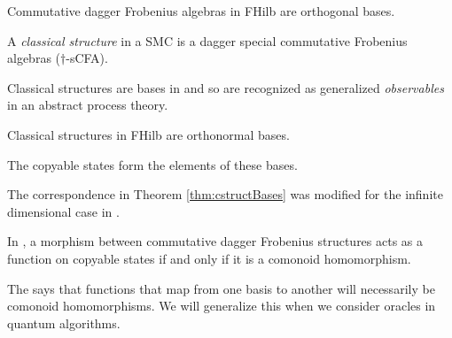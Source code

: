 \begin{theorem}{\cite[Thm 5.1]{coecke2013new}}
Commutative dagger Frobenius algebras in FHilb are orthogonal bases.
\end{theorem}

\begin{defn}
A \emph{classical structure} in a SMC is a dagger special commutative Frobenius algebras ($\dagger$-sCFA).
\end{defn}
\noindent Classical structures are bases in  and so are recognized as generalized \emph{observables} in an abstract process theory.

\begin{theorem}{\cite[Sec 6]{coecke2013new}}
\label{thm:cstructBases}
Classical structures in FHilb are orthonormal bases.
\end{theorem}

\noindent The copyable states form the elements of these bases.

\begin{remark}
The correspondence in Theorem \ref{thm:cstructBases} was modified for the infinite dimensional case in \cite{abramsky2012h}.
\end{remark}

\begin{theorem}
\end{theorem}

\begin{corollary}
In , a morphism between commutative dagger Frobenius structures acts as a function on copyable states if and only if it is a comonoid homomorphism.
\end{corollary}

The says that functions that map from one basis to another will necessarily be comonoid homomorphisms.  We will generalize this when we consider oracles in quantum algorithms.

